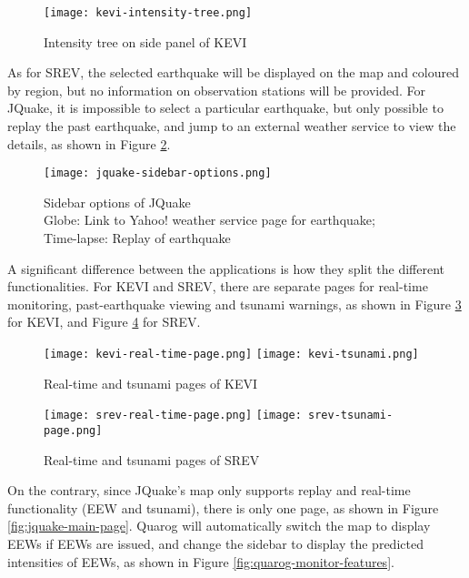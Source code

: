 \begin{figure}[htp]
    \centering

    \texttt{[image: kevi-intensity-tree.png]}
    \caption{Intensity tree on side panel of KEVI}
    \label{fig:kevi-intensity-tree}
\end{figure}

As for SREV, the selected earthquake will be displayed on the map and coloured by region, but no information on observation stations will be provided. For JQuake, it is impossible to select a particular earthquake, but only possible to replay the past earthquake, and jump to an external weather service to view the details, as shown in Figure \ref{fig:jquake-sidebar-options}.

\begin{figure}[htp]
    \centering

    \texttt{[image: jquake-sidebar-options.png]}
    \caption[Sidebar options of JQuake]{Sidebar options of JQuake\\
        Globe: Link to Yahoo! weather service page for earthquake;\\
        Time-lapse: Replay of earthquake}
    \label{fig:jquake-sidebar-options}
\end{figure}

A significant difference between the applications is how they split the different functionalities. For KEVI and SREV, there are separate pages for real-time monitoring, past-earthquake viewing and tsunami warnings, as shown in Figure \ref{fig:kevi-real-time-tsunami} for KEVI, and Figure \ref{fig:srev-real-time-tsunami} for SREV.

\begin{figure}[htp]
    \centering

    \texttt{[image: kevi-real-time-page.png]}
    \texttt{[image: kevi-tsunami.png]}
    \caption{Real-time and tsunami pages of KEVI}
    \label{fig:kevi-real-time-tsunami}
\end{figure}

\begin{figure}[htp]
    \centering

    \texttt{[image: srev-real-time-page.png]}
    \texttt{[image: srev-tsunami-page.png]}
    \caption{Real-time and tsunami pages of SREV}
    \label{fig:srev-real-time-tsunami}
\end{figure}

On the contrary, since JQuake's map only supports replay and real-time functionality (EEW and tsunami), there is only one page, as shown in Figure \ref{fig:jquake-main-page}. Quarog will automatically switch the map to display EEWs if EEWs are issued, and change the sidebar to display the predicted intensities of EEWs, as shown in Figure \ref{fig:quarog-monitor-features}.

